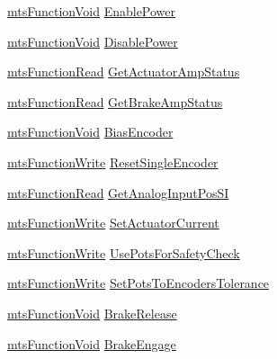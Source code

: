 \begin{DoxyCompactItemize}
\item 
\hyperlink{classmts_function_void}{mts\+Function\+Void} \hyperlink{structmts_intuitive_research_kit_arm_1_1_interface_robot_torque_a1cc2051ece69d30798eab88485a908af}{Enable\+Power}
\item 
\hyperlink{classmts_function_void}{mts\+Function\+Void} \hyperlink{structmts_intuitive_research_kit_arm_1_1_interface_robot_torque_a1075f510ccbb07968017a14010205b79}{Disable\+Power}
\item 
\hyperlink{classmts_function_read}{mts\+Function\+Read} \hyperlink{structmts_intuitive_research_kit_arm_1_1_interface_robot_torque_a0f08565aab45b8fa4acad986d2c32275}{Get\+Actuator\+Amp\+Status}
\item 
\hyperlink{classmts_function_read}{mts\+Function\+Read} \hyperlink{structmts_intuitive_research_kit_arm_1_1_interface_robot_torque_aa8c67aca50d320753b707fbe5a889ed3}{Get\+Brake\+Amp\+Status}
\item 
\hyperlink{classmts_function_void}{mts\+Function\+Void} \hyperlink{structmts_intuitive_research_kit_arm_1_1_interface_robot_torque_af0e16c8af9d23e035fd72f8da89ffd79}{Bias\+Encoder}
\item 
\hyperlink{classmts_function_write}{mts\+Function\+Write} \hyperlink{structmts_intuitive_research_kit_arm_1_1_interface_robot_torque_ae1012138a986fe735b1a062039e9c644}{Reset\+Single\+Encoder}
\item 
\hyperlink{classmts_function_read}{mts\+Function\+Read} \hyperlink{structmts_intuitive_research_kit_arm_1_1_interface_robot_torque_ac78a1e98bfa50cb04284238cdbaeae3b}{Get\+Analog\+Input\+Pos\+S\+I}
\item 
\hyperlink{classmts_function_write}{mts\+Function\+Write} \hyperlink{structmts_intuitive_research_kit_arm_1_1_interface_robot_torque_a67685d0499c298985fa6dff4c8c3a85b}{Set\+Actuator\+Current}
\item 
\hyperlink{classmts_function_write}{mts\+Function\+Write} \hyperlink{structmts_intuitive_research_kit_arm_1_1_interface_robot_torque_a33c894c1024853e9cbc7f496b2e05199}{Use\+Pots\+For\+Safety\+Check}
\item 
\hyperlink{classmts_function_write}{mts\+Function\+Write} \hyperlink{structmts_intuitive_research_kit_arm_1_1_interface_robot_torque_a53b75a3db7f1bbabb04430f347691e66}{Set\+Pots\+To\+Encoders\+Tolerance}
\item 
\hyperlink{classmts_function_void}{mts\+Function\+Void} \hyperlink{structmts_intuitive_research_kit_arm_1_1_interface_robot_torque_a81ef49a3d9bb641617bb6be6c7e56b78}{Brake\+Release}
\item 
\hyperlink{classmts_function_void}{mts\+Function\+Void} \hyperlink{structmts_intuitive_research_kit_arm_1_1_interface_robot_torque_a9977f2643a5e43b02d84f02d83cc0217}{Brake\+Engage}
\end{DoxyCompactItemize}


